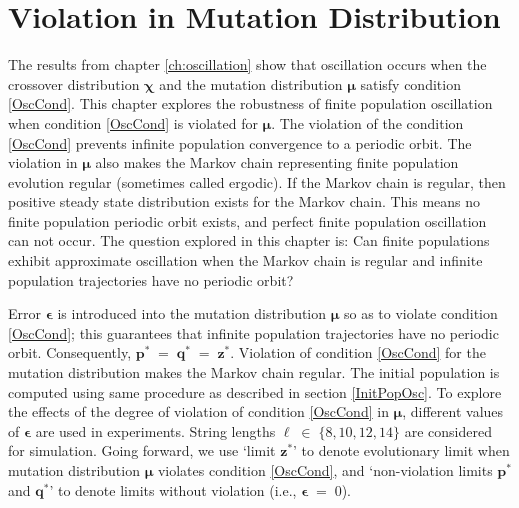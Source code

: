 \chapter{Violation in Mutation Distribution} \label{ch:muviolation}
The results from chapter \ref{ch:oscillation} show that oscillation occurs
when the crossover distribution $\bm{\chi}$ and the mutation distribution $\bm{\mu}$ 
satisfy condition \ref{OscCond}. This chapter explores the robustness of 
finite population oscillation when condition \ref{OscCond} is violated for $\bm{\mu}$. 
The violation of the condition \ref{OscCond} prevents 
infinite population convergence to a periodic orbit.
The violation in $\bm{\mu}$ also makes the Markov chain representing finite population evolution regular 
(sometimes called ergodic). If the Markov chain is regular, 
then positive steady state distribution exists for the Markov chain. 
This means no finite population periodic orbit exists, 
and perfect finite population oscillation can not occur. 
The question explored in this chapter is: Can finite populations exhibit approximate oscillation when the
Markov chain is regular and infinite population trajectories
have no periodic orbit?

Error $\bm{\epsilon}$ is introduced into the mutation distribution $\bm{\mu}$ so as to 
violate condition \ref{OscCond}; this guarantees that 
infinite population trajectories have no periodic orbit. Consequently, $\bm{p}^\ast \;=\; \bm{q}^\ast \;=\; \bm{z}^\ast$. 
Violation of condition \ref{OscCond} for the mutation distribution makes the Markov chain regular. The initial population is 
computed using same procedure as described in section \ref{InitPopOsc}. To explore the effects of the degree  
of violation of condition \ref{OscCond} in $\bm{\mu}$, different values of $\bm{\epsilon}$ are used in experiments. 
String lengths $\ell \;\in\; \{8, 10, 12, 14\}$ are considered for simulation.
Going forward, we use `limit $\bm{z}^\ast$' to denote evolutionary limit when mutation distribution $\bm{\mu}$ 
violates condition \ref{OscCond}, and 
`non-violation limits $\bm{p}^\ast$ and $\bm{q}^\ast$' to denote limits without violation (i.e., $\bm{\epsilon} \;=\; 0$).

